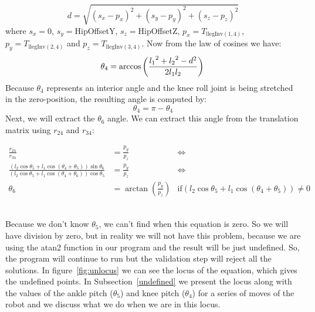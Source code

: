 \[
d = \sqrt{\left(s_x-p_x\right)^2 + \left(s_y-p_y\right)^2 + \left(s_z-p_z\right)^2}
\]
where $s_x = 0$, $s_y = $HipOffsetY, $s_z =$HipOffsetZ, $p_x = T_{\text{llegInv}(1,4)}$, $p_y = T_{\text{llegInv}(2,4)}$ and $p_z = T_{\text{llegInv}(3,4)}$. Now from the law of cosines we have:
\[
\theta_4 =\arccos\left(\frac{{l_1}^2 + {l_2}^2 - d^2}{2 l_1 l_2}\right)\\
\]
Because \(\theta_4\) represents an interior angle and the knee roll joint is being stretched in the zero-position, the resulting angle is computed by:
\[
\theta_4 = \pi - \theta_4
\]
Next, we will extract the \(\theta_6\) angle. We can extract this angle from the translation matrix using \(r_{24}\) and \(r_{34}\):
\begin{small}
\begin{align*}
\frac{r_{24}}{r_{34}} &= \frac{p_y}{p_z} &\Leftrightarrow \\
\frac{\left(l_2\cos\theta_5 + l_1 \cos\left(\theta_4 + \theta_5\right)\right)\sin\theta_6}{\left(l_2\cos\theta_5 + l_1 \cos\left(\theta_4 + \theta_6\right)\right) \cos\theta_5} &= \frac{p_y}{p_z} &\Leftrightarrow \\
\theta_6 &= \arctan\left(\frac{p_y}{p_z}\right)&\text{if} \left(l_2\cos\theta_5 + l_1 \cos\left(\theta_4 + \theta_5\right)\right) \neq 0
\end{align*}
\end{small}\\
Because we don't know $\theta_5$, we can't find when this equation is zero. So we will have division by zero, but in reality we will not have this problem, because we are using the atan2 function in our program and the result will be just undefined. So, the program will continue to run but the validation step will reject all the solutions. In figure~\ref{fig:unlocus} we can see the locus of the equation, which gives the undefined points. In Subsection~\ref{undefined} we present the locus along with the values of the ankle pitch ($\theta_5$) and knee pitch ($\theta_4$) for a series of moves of the robot and we discuss what we do when we are in this locus.\\

